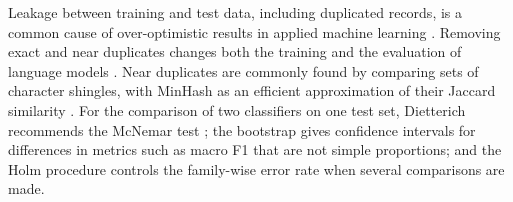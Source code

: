Leakage between training and test data, including duplicated records, is a common cause of over-optimistic results in applied machine learning \cite{kapoor2023}. Removing exact and near duplicates changes both the training and the evaluation of language models \cite{lee2022}. Near duplicates are commonly found by comparing sets of character shingles, with MinHash as an efficient approximation of their Jaccard similarity \cite{broder1997}. For the comparison of two classifiers on one test set, Dietterich \cite{dietterich1998} recommends the McNemar test \cite{mcnemar1947}; the bootstrap \cite{efron1993} gives confidence intervals for differences in metrics such as macro F1 that are not simple proportions; and the Holm procedure \cite{holm1979,aickin1996} controls the family-wise error rate when several comparisons are made.
